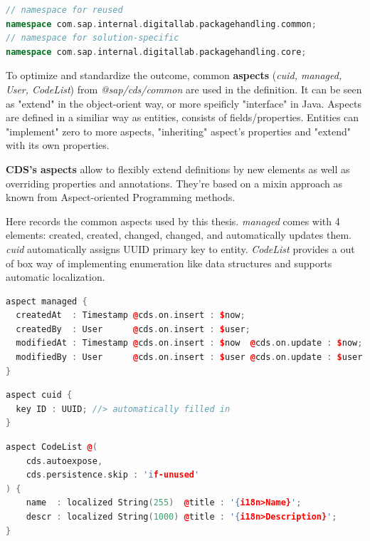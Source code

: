 \begin{lstlisting}[language={c++}]
// namespace for reused
namespace com.sap.internal.digitallab.packagehandling.common; 
// namespace for solution-specific
namespace com.sap.internal.digitallab.packagehandling.core; 
\end{lstlisting}


To optimize and standardize the outcome, common \textbf{aspects} (\textit{cuid, managed, User, CodeList}) from \textit{@sap/cds/common} are used in the definition. It can be seen as "extend" in the object-orient way, or more speificly "interface" in Java. Aspects are defined in a similiar way as entities, consists of fields/properties. Entities can "implement" zero to more aspects, "inheriting" aspect's properties and "extend" with its own properties. 

\begin{definition}
    \textbf{CDS's aspects} allow to flexibly extend definitions by new elements as well as overriding properties and annotations. They're based on a mixin approach as known from Aspect-oriented Programming methods.
\end{definition}

Here records the common aspects used by this thesis. \textit{managed} comes with 4 elements: created, created, changed, changed, and automatically updates them. \textit{cuid} automatically assigns UUID primary key to entity. \textit{CodeList} provides a out of box way of implementing enumeration like data structures and supports automatic localization.

\begin{lstlisting}[language={c++}]
aspect managed {
  createdAt  : Timestamp @cds.on.insert : $now;
  createdBy  : User      @cds.on.insert : $user;
  modifiedAt : Timestamp @cds.on.insert : $now  @cds.on.update : $now;
  modifiedBy : User      @cds.on.insert : $user @cds.on.update : $user;
}
\end{lstlisting}

\begin{lstlisting}[language={c++}]
aspect cuid {
  key ID : UUID; //> automatically filled in
}
\end{lstlisting}

\begin{lstlisting}[language={c++}]
aspect CodeList @(
    cds.autoexpose,
    cds.persistence.skip : 'if-unused'
) {
    name  : localized String(255)  @title : '{i18n>Name}';
    descr : localized String(1000) @title : '{i18n>Description}';
}
\end{lstlisting}

